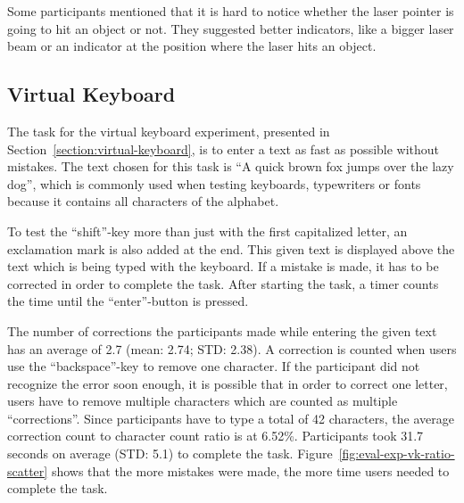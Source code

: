 Some participants mentioned that it is hard to notice whether the laser pointer is going to hit an object or not. They suggested better indicators, like a bigger laser beam or an indicator at the position where the laser hits an object.


\subsection{Virtual Keyboard}\label{section:eval-res-vk}

The task for the virtual keyboard experiment, presented in Section~\ref{section:virtual-keyboard}, is to enter a text as fast as possible without mistakes. The text chosen for this task is \enquote{A quick brown fox jumps over the lazy dog}, which is commonly used when testing keyboards, typewriters or fonts because it contains all characters of the alphabet.

To test the \enquote{shift}-key more than just with the first capitalized letter, an exclamation mark is also added at the end. This given text is displayed above the text which is being typed with the keyboard. If a mistake is made, it has to be corrected in order to complete the task. After starting the task, a timer counts the time until the \enquote{enter}-button is pressed.

The number of corrections the participants made while entering the given text has an average of 2.7 (mean: 2.74; \gls{STD}: 2.38). A correction is counted when users use the \enquote{backspace}-key to remove one character. If the participant did not recognize the error soon enough, it is possible that in order to correct one letter, users have to remove multiple characters which are counted as multiple \enquote{corrections}. Since participants have to type a total of 42 characters, the average correction count to character count ratio is at 6.52\%.
Participants took 31.7 seconds on average (\gls{STD}: 5.1) to complete the task. Figure~\ref{fig:eval-exp-vk-ratio-scatter} shows that the more mistakes were made, the more time users needed to complete the task.

